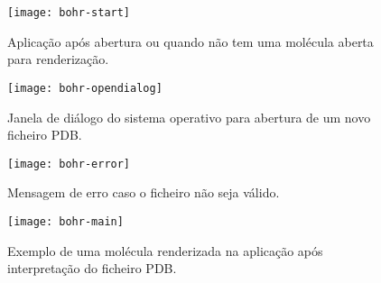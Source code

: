 \begin{figure}[!btp]
    \centering
    \texttt{[image: bohr-start]}
    \caption[Aplicação após abertura]{Aplicação após abertura ou quando não tem uma molécula aberta para renderização.}
    \label{fig::bohr-start}
\end{figure}


\begin{figure}[!btp]
    \centering
    \texttt{[image: bohr-opendialog]}
    \caption[Janela de diálogo para abertura de ficheiro]{Janela de diálogo do sistema operativo para abertura de um novo ficheiro \ac{PDB}.}
    \label{fig::bohr-opendialog}
\end{figure}


\begin{figure}[!btp]
    \centering
    \texttt{[image: bohr-error]}
    \caption[Mensagem de erro]{Mensagem de erro caso o ficheiro não seja válido.}
    \label{fig::bohr-error}
\end{figure}


\begin{figure}[!btp]
    \centering
    \texttt{[image: bohr-main]}
    \caption[Exemplo de molécula renderizada]{Exemplo de uma molécula renderizada na aplicação após interpretação do ficheiro \ac{PDB}.}
    \label{fig::bohr-main}
\end{figure}
